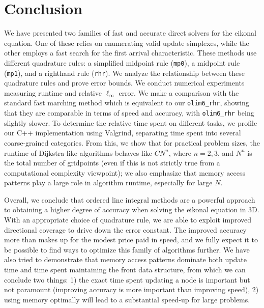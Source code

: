 \documentclass[eikonal.tex]{subfiles}
\begin{document}
\section{Conclusion}

We have presented two families of fast and accurate direct solvers for
the eikonal equation. One of these relies on enumerating valid update
simplexes, while the other employs a fast search for the first arrival
characteristic. These methods use different quadrature rules: a
simplified midpoint rule (\texttt{mp0}), a midpoint rule
(\texttt{mp1}), and a righthand rule (\texttt{rhr}). We analyze the
relationship between these quadrature rules and prove error bounds. We
conduct numerical experiments measuring runtime and relative
$\ell_\infty$ error. We make a comparison with the standard fast
marching method which is equivalent to our \texttt{olim6\_rhr},
showing that they are comparable in terms of speed and accuracy, with
\texttt{olim6\_rhr} being slightly slower. To determine the relative
time spent on different tasks, we profile our C++ implementation using
Valgrind, separating time spent into several coarse-grained
categories. From this, we show that for practical problem sizes, the
runtime of Dijkstra-like algorithms behaves like $C N^n$, where
$n = 2, 3$, and $N^n$ is the total number of gridpoints (even if this
is not strictly true from a computational complexity viewpoint); we
also emphasize that memory access patterns play a large role in
algorithm runtime, especially for large $N$.

Overall, we conclude that ordered line integral methods are a powerful
approach to obtaining a higher degree of accuracy when solving the
eikonal equation in 3D. With an appropriate choice of quadrature rule,
we are able to exploit improved directional coverage to drive down the
error constant. The improved accuracy more than makes up for the
modest price paid in speed, and we fully expect it to be possible to
find ways to optimize this family of algorithms further. We have also
tried to demonstrate that memory access patterns dominate both update
time and time spent maintaining the front data structure, from which
we can conclude two things: 1) the exact time spent updating a node is
important but not paramount (improving accuracy is more important than
improving speed), 2) using memory optimally will lead to a substantial
speed-up for large problems.
\end{document}
